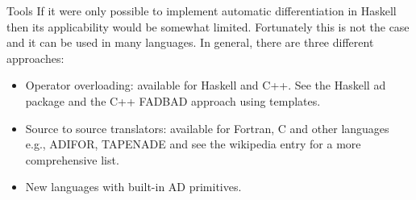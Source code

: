 \documentclass{beamer}
\begin{document}
\begin{frame}[fragile]{Tools}
  If it were only possible to implement automatic differentiation in
  Haskell then its applicability would be somewhat
  limited. Fortunately this is not the case and it can be used in many
  languages. In general, there are three different approaches:

\begin{itemize}
\item Operator overloading: available for Haskell and C++. See the
  Haskell ad package and the C++ FADBAD approach using templates.
\item Source to source translators: available for Fortran, C and other
  languages e.g., ADIFOR, TAPENADE and see the wikipedia entry for a
  more comprehensive list.
\item New languages with built-in AD primitives.
\end{itemize}
\end{frame}
\end{document}
